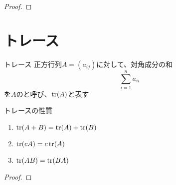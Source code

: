 \documentclass[../../../topic_linear-algebra]{subfiles}
\begin{document}
\begin{proof}
\end{proof}

\sectionline
\section{トレース}

\begin{definition}{トレース}
  正方行列$A=(a_{ij})$に対して、対角成分の和
  \begin{equation*}
    \sum_{i=1}^n a_{ii}
  \end{equation*}
  を$A$のと呼び、$\tr(A)$と表す
\end{definition}

\begin{theorem}{トレースの性質}
  \begin{enumerate}[label=\romanlabel]
    \item $\tr(A+B) = \tr(A) + \tr(B)$
    \item $\tr(cA) = c\tr(A)$
    \item $\tr(AB) = \tr(BA)$
  \end{enumerate}
\end{theorem}

\begin{proof}
\end{proof}
\end{document}
